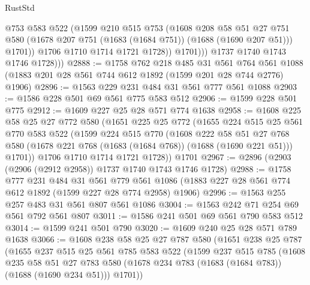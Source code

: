 \begin{lexlean}{RustStd}
\begin{coremodule}
                    @753
                    @583
                    @522
                    (@1599
                      @210
                      @515
                      @753
                      (@1608
                        @208
                        @58
                        @51
                        @27
                        @751
                        @580
                        (@1678 @207 @751 (@1683 (@1684 @751)) (@1688 (@1690 @207 @51)))
                        @1701))
                    @1706
                    @1710
                    @1714
                    @1721
                    @1728))
                @1701)))
          @1737
          @1740
          @1743
          @1746
          @1728)))
@2888 := @1758
    @762
    @218
    @485
    @31
    @561
    @764
    @561
    @1088
    (@1883 @201 @28 @561 @744 @612 @1892 (@1599 @201 @28 @744 @2776) @1906)
@2896 := @1563 @229 @231 @484 @31 @561 @777 @561 @1088
@2903 := @1586 @228 @501 @69 @561 @775 @583 @512
@2906 := @1599 @228 @501 @775
@2912 := @1609 @227 @25 @28 @571 @774 @1638
@2958 := @1608
    @225
    @58
    @25
    @27
    @772
    @580
    (@1651
      @225
      @25
      @772
      (@1655
        @224
        @515
        @25
        @561
        @770
        @583
        @522
        (@1599
          @224
          @515
          @770
          (@1608
            @222
            @58
            @51
            @27
            @768
            @580
            (@1678 @221 @768 (@1683 (@1684 @768)) (@1688 (@1690 @221 @51)))
            @1701))
        @1706
        @1710
        @1714
        @1721
        @1728))
    @1701
@2967 := @2896 (@2903 (@2906 (@2912 @2958)) @1737 @1740 @1743 @1746 @1728)
@2988 := @1758
    @777
    @231
    @484
    @31
    @561
    @779
    @561
    @1086
    (@1883 @227 @28 @561 @774 @612 @1892 (@1599 @227 @28 @774 @2958) @1906)
@2996 := @1563 @255 @257 @483 @31 @561 @807 @561 @1086
@3004 := @1563 @242 @71 @254 @69 @561 @792 @561 @807
@3011 := @1586 @241 @501 @69 @561 @790 @583 @512
@3014 := @1599 @241 @501 @790
@3020 := @1609 @240 @25 @28 @571 @789 @1638
@3066 := @1608
    @238
    @58
    @25
    @27
    @787
    @580
    (@1651
      @238
      @25
      @787
      (@1655
        @237
        @515
        @25
        @561
        @785
        @583
        @522
        (@1599
          @237
          @515
          @785
          (@1608
            @235
            @58
            @51
            @27
            @783
            @580
            (@1678 @234 @783 (@1683 (@1684 @783)) (@1688 (@1690 @234 @51)))
            @1701))

\end{coremodule}
\end{lexlean}
